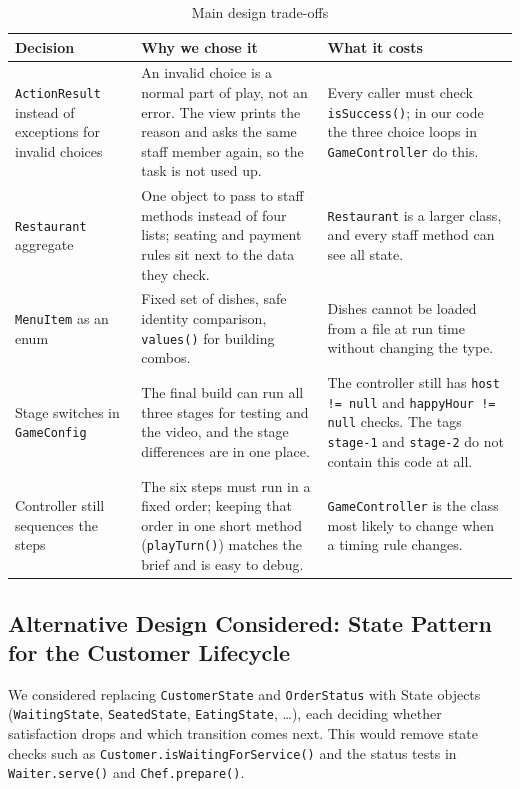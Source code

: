 \begin{table}[H]
\centering
\small
\begin{tabularx}{\textwidth}{>{\raggedright\arraybackslash}p{3.2cm}XX}
\toprule
\textbf{Decision} & \textbf{Why we chose it} & \textbf{What it costs} \\
\midrule
\texttt{ActionResult} instead of exceptions for invalid choices & An invalid choice is a normal part of play, not an error. The view prints the reason and asks the same staff member again, so the task is not used up. & Every caller must check \texttt{isSuccess()}; in our code the three choice loops in \texttt{GameController} do this. \\
\texttt{Restaurant} aggregate & One object to pass to staff methods instead of four lists; seating and payment rules sit next to the data they check. & \texttt{Restaurant} is a larger class, and every staff method can see all state. \\
\texttt{MenuItem} as an enum & Fixed set of dishes, safe identity comparison, \texttt{values()} for building combos. & Dishes cannot be loaded from a file at run time without changing the type. \\
Stage switches in \texttt{GameConfig} & The final build can run all three stages for testing and the video, and the stage differences are in one place. & The controller still has \texttt{host != null} and \texttt{happyHour != null} checks. The tags \texttt{stage-1} and \texttt{stage-2} do not contain this code at all. \\
Controller still sequences the steps & The six steps must run in a fixed order; keeping that order in one short method (\texttt{playTurn()}) matches the brief and is easy to debug. & \texttt{GameController} is the class most likely to change when a timing rule changes. \\
\bottomrule
\end{tabularx}
\caption{Main design trade-offs}
\end{table}

\subsection{Alternative Design Considered: State Pattern for the Customer Lifecycle}

We considered replacing \texttt{CustomerState} and \texttt{OrderStatus} with State objects (\texttt{WaitingState}, \texttt{SeatedState}, \texttt{EatingState}, \ldots), each deciding whether satisfaction drops and which transition comes next. This would remove state checks such as \texttt{Customer.isWaitingForService()} and the status tests in \texttt{Waiter.serve()} and \texttt{Chef.prepare()}.

